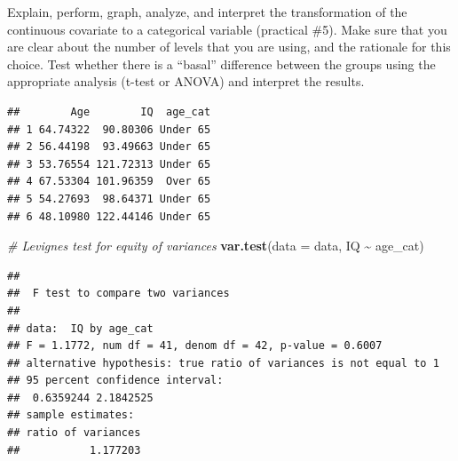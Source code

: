 \documentclass[
]{book}
\newenvironment{Shaded}{\begin{snugshade}}{\end{snugshade}}
\newcommand{\AttributeTok}[1]{\textcolor[rgb]{0.13,0.29,0.53}{#1}}
\newcommand{\CommentTok}[1]{\textcolor[rgb]{0.56,0.35,0.01}{\textit{#1}}}
\newcommand{\ConstantTok}[1]{\textcolor[rgb]{0.56,0.35,0.01}{#1}}
\newcommand{\DecValTok}[1]{\textcolor[rgb]{0.00,0.00,0.81}{#1}}
\newcommand{\FunctionTok}[1]{\textcolor[rgb]{0.13,0.29,0.53}{\textbf{#1}}}
\newcommand{\NormalTok}[1]{#1}
\newcommand{\OtherTok}[1]{\textcolor[rgb]{0.56,0.35,0.01}{#1}}
\newcommand{\SpecialCharTok}[1]{\textcolor[rgb]{0.81,0.36,0.00}{\textbf{#1}}}
\newcommand{\StringTok}[1]{\textcolor[rgb]{0.31,0.60,0.02}{#1}}
\begin{document}
Explain, perform, graph, analyze, and interpret the transformation of the continuous covariate to a categorical variable (practical \#5). Make sure that you are clear about the number of levels that you are using, and the rationale for this choice. Test whether there is a ``basal'' difference between the groups using the appropriate analysis (t-test or ANOVA) and interpret the results.

\begin{Shaded}
\end{Shaded}

\begin{verbatim}
##        Age        IQ  age_cat
## 1 64.74322  90.80306 Under 65
## 2 56.44198  93.49663 Under 65
## 3 53.76554 121.72313 Under 65
## 4 67.53304 101.96359  Over 65
## 5 54.27693  98.64371 Under 65
## 6 48.10980 122.44146 Under 65
\end{verbatim}

\begin{Shaded}
\begin{Highlighting}[]
\CommentTok{\# Levigne\textquotesingle{}s test for equity of variances}
\FunctionTok{var.test}\NormalTok{(}\AttributeTok{data =}\NormalTok{ data, IQ }\SpecialCharTok{\textasciitilde{}}\NormalTok{ age\_cat)}
\end{Highlighting}
\end{Shaded}

\begin{verbatim}
## 
##  F test to compare two variances
## 
## data:  IQ by age_cat
## F = 1.1772, num df = 41, denom df = 42, p-value = 0.6007
## alternative hypothesis: true ratio of variances is not equal to 1
## 95 percent confidence interval:
##  0.6359244 2.1842525
## sample estimates:
## ratio of variances 
##           1.177203
\end{verbatim}
\end{document}
